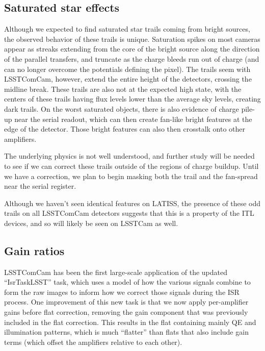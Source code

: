 \subsection{Saturated star effects}

Although we expected to find saturated star trails coming from bright sources, the observed behavior of these trails is unique.
Saturation spikes on most cameras appear as streaks extending from the core of the bright source along the direction of the parallel transfers, and truncate as the charge bleeds run out of charge (and can no longer overcome the potentials defining the pixel).
The trails seem with LSSTComCam, however, extend the entire height of the detectors, crossing the midline break.
These trails are also not at the expected high state, with the centers of these trails having flux levels lower than the average sky levels, creating dark trails.
On the worst saturated objects, there is also evidence of charge pile-up near the serial readout, which can then create fan-like bright features at the edge of the detector.
Those bright features can also then crosstalk onto other amplifiers.

The underlying physics is not well understood, and further study will be needed to see if we can correct these trails outside of the regions of charge buildup.
Until we have a correction, we plan to begin masking both the trail and the fan-spread near the serial register.

Although we haven't seen identical features on LATISS, the presence of these odd trails on all LSSTComCam detectors suggests that this is a property of the ITL devices, and so will likely be seen on LSSTCam as well.


\subsection{Gain ratios}

LSSTComCam has been the first large-scale application of the updated ``IsrTaskLSST'' task, which uses a model of how the various signals combine to form the raw images to inform how we correct those signals during the ISR process.
One improvement of this new task is that we now apply per-amplifier gains before flat correction, removing the gain component that was previously included in the flat correction.
This results in the flat containing mainly QE and illumination patterns, which is much ``flatter'' than flats that also include gain terms (which offset the amplifiers relative to each other).



